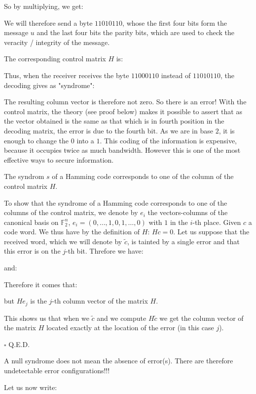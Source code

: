 	So by multiplying, we get:
	
	We will therefore send a byte $11010110$, whose the first four bits form the message $u$ and the last four bits the parity bits, which are used to check the veracity / integrity of the message.

	The corresponding control matrix $H$ is:
	
	Thus, when the receiver receives the byte $11000110$ instead of $11010110$, the decoding gives as "syndrome":
	
	The resulting column vector is therefore not zero. So there is an error! With the control matrix, the theory (see proof below) makes it possible to assert that as the vector obtained is the same as that which is in fourth position in the decoding matrix, the error is due to the fourth bit. As we are in base $2$, it is enough to change the $0$ into a $1$. This coding of the information is expensive, because it occupies twice as much bandwidth. However this is one of the most effective ways to secure information.

	\begin{theorem}
	The syndrom $s$ of a Hamming code corresponds to one of the column of the control matrix $H$.
	\end{theorem}
	\begin{dem}
	To show that the syndrome of a Hamming code corresponds to one of the columns of the control matrix, we denote by $e_i$ the vectors-columns of the canonical basis on $\mathbb{F}_2^n$, $e_i=(0,\ldots,1,0,1,\ldots,0)$ with $1$ in the $i$-th place. Given $c$ a code word. We thus have by the definition of $H$: $Hc=0$. Let us suppose that the received word, which we will denote by $\tilde{c}$, is tainted by a single error and that this error is on the $j$-th bit. Threfore we have:
	
	and:
	
	Therefore it comes that:
	
	but $He_j$ is the $j$-th column vector of the matrix $H$.
	
	This shows us that when we $\tilde{c}$ and we compute $H\tilde{c}$ we get the column vector of the matrix $H$ located exactly at the location of the error (in this case $j$).
	\begin{flushright}
		$\square$  Q.E.D.
	\end{flushright}
	\end{dem}
	\begin{tcolorbox}[title=Remark,colframe=black,arc=10pt]
	A null syndrome does not mean the absence of error(s). There are therefore undetectable error configurations!!!
	\end{tcolorbox}
	Let us now write:
	
